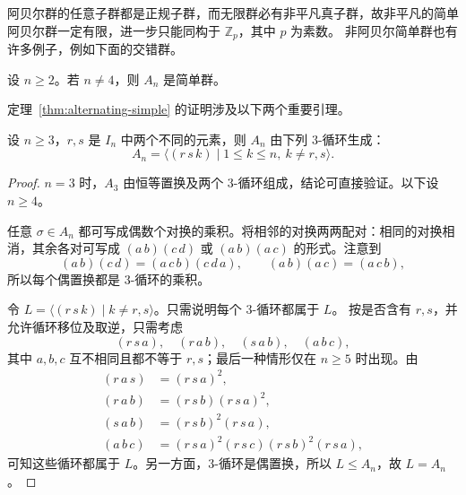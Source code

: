 \begin{purplenote}
阿贝尔群的任意子群都是正规子群，而无限群必有非平凡真子群，故非平凡的简单阿贝尔群一定有限，进一步只能同构于 $\mathbb Z_p$，其中 $p$ 为素数。
非阿贝尔简单群也有许多例子，例如下面的交错群。
\end{purplenote}

\begin{theorem}\label{thm:alternating-simple}
设 $n\geq2$。若 $n\neq4$，则 $A_n$ 是简单群。
\end{theorem}

\begin{purplenote}
定理~\ref{thm:alternating-simple} 的证明涉及以下两个重要引理。
\end{purplenote}

\begin{lemma}\label{lem:alternating-generators}
设 $n\geq3$，$r,s$ 是 $I_n$ 中两个不同的元素，则 $A_n$ 由下列 $3$-循环生成：
\[
  A_n=\bigl\langle(r\,s\,k)\mid 1\leq k\leq n,\ k\neq r,s\bigr\rangle.
\]
\end{lemma}

\begin{proof}
$n=3$ 时，$A_3$ 由恒等置换及两个 $3$-循环组成，结论可直接验证。以下设 $n\geq4$。

任意 $\sigma\in A_n$ 都可写成偶数个对换的乘积。将相邻的对换两两配对：相同的对换相消，其余各对可写成 $(a\,b)(c\,d)$ 或 $(a\,b)(a\,c)$ 的形式。注意到
\[
  (a\,b)(c\,d)=(a\,c\,b)(c\,d\,a),
  \qquad (a\,b)(a\,c)=(a\,c\,b),
\]
所以每个偶置换都是 $3$-循环的乘积。

令 $L=\langle(r\,s\,k)\mid k\neq r,s\rangle$。只需说明每个 $3$-循环都属于 $L$。
按是否含有 $r,s$，并允许循环移位及取逆，只需考虑
\[
  (r\,s\,a),\quad(r\,a\,b),\quad(s\,a\,b),\quad(a\,b\,c),
\]
其中 $a,b,c$ 互不相同且都不等于 $r,s$；最后一种情形仅在 $n\geq5$ 时出现。由
\begin{align*}
  (r\,a\,s)&=(r\,s\,a)^2,\\
  (r\,a\,b)&=(r\,s\,b)(r\,s\,a)^2,\\
  (s\,a\,b)&=(r\,s\,b)^2(r\,s\,a),\\
  (a\,b\,c)&=(r\,s\,a)^2(r\,s\,c)(r\,s\,b)^2(r\,s\,a),
\end{align*}
可知这些循环都属于 $L$。另一方面，$3$-循环是偶置换，所以 $L\leq A_n$，故 $L=A_n$。
\end{proof}

